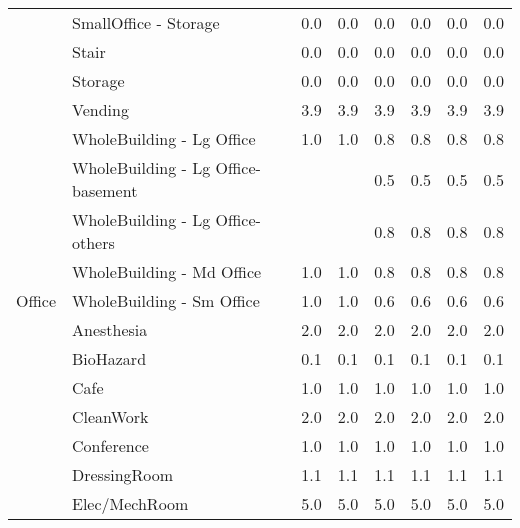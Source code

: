 \begin{center}
\begin{longtable}{p{1.25in}p{1in}p{0.5in}p{0.5in}p{0.5in}p{0.5in}p{0.5in}p{0.5in}}
                                   & SmallOffice - Storage                & 0.0     & 0.0     & 0.0    & 0.0   & 0.0   & 0.0    \\
                                   & Stair                                & 0.0     & 0.0     & 0.0    & 0.0   & 0.0   & 0.0    \\
                                   & Storage                              & 0.0     & 0.0     & 0.0    & 0.0   & 0.0   & 0.0    \\
                                   & Vending                              & 3.9     & 3.9     & 3.9    & 3.9   & 3.9   & 3.9    \\
                                   & WholeBuilding - Lg Office            & 1.0     & 1.0     & 0.8    & 0.8   & 0.8   & 0.8    \\
                                   & WholeBuilding - Lg   Office-basement &         &         & 0.5    & 0.5   & 0.5   & 0.5    \\
                                   & WholeBuilding - Lg   Office-others   &         &         & 0.8    & 0.8   & 0.8   & 0.8    \\
                                   & WholeBuilding - Md Office            & 1.0     & 1.0     & 0.8    & 0.8   & 0.8   & 0.8    \\
Office                             & WholeBuilding - Sm Office            & 1.0     & 1.0     & 0.6    & 0.6   & 0.6   & 0.6    \\
                                   & Anesthesia                           & 2.0     & 2.0     & 2.0    & 2.0   & 2.0   & 2.0    \\
                                   & BioHazard                            & 0.1     & 0.1     & 0.1    & 0.1   & 0.1   & 0.1    \\
                                   & Cafe                                 & 1.0     & 1.0     & 1.0    & 1.0   & 1.0   & 1.0    \\
                                   & CleanWork                            & 2.0     & 2.0     & 2.0    & 2.0   & 2.0   & 2.0    \\
                                   & Conference                           & 1.0     & 1.0     & 1.0    & 1.0   & 1.0   & 1.0    \\
                                   & DressingRoom                         & 1.1     & 1.1     & 1.1    & 1.1   & 1.1   & 1.1    \\
                                   & Elec/MechRoom                        & 5.0     & 5.0     & 5.0    & 5.0   & 5.0   & 5.0    \\

\end{longtable}
\end{center}
